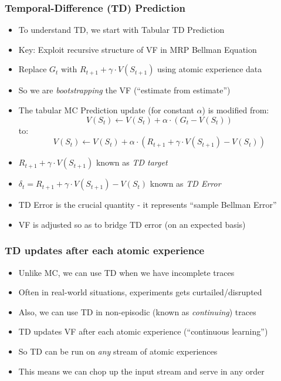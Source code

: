 \documentclass[handout]{beamer}
\begin{document}
\begin{frame}
\frametitle{Temporal-Difference (TD) Prediction}
\pause
\begin{itemize}[<+->]
\item To understand TD, we start with Tabular TD Prediction
\item Key: Exploit recursive structure of VF in MRP Bellman Equation
\item Replace $G_t$ with $R_{t+1} + \gamma \cdot V(S_{t+1})$ using atomic experience data
\item So we are {\em bootstrapping} the VF (``estimate from estimate'')
\item The tabular MC Prediction update (for constant $\alpha$) is modified from:
$$V(S_t) \leftarrow V(S_t) + \alpha \cdot (G_t - V(S_t))$$
to:
$$V(S_t) \leftarrow V(S_t) + \alpha \cdot (R_{t+1} + \gamma \cdot V(S_{t+1}) - V(S_t))$$
\item $R_{t+1} + \gamma \cdot V(S_{t+1})$ known as {\em TD target}
\item  $\delta_t = R_{t+1} + \gamma \cdot V(S_{t+1}) - V(S_t)$ known as  {\em TD Error}
\item TD Error is the crucial quantity - it represents ``sample Bellman Error''
\item VF is adjusted so as to bridge TD error (on an expected basis)
\end{itemize}
\end{frame}

\begin{frame}
\frametitle{TD updates after each atomic experience}
\pause
\begin{itemize}[<+->]
\item Unlike MC, we can use TD when we have incomplete traces
\item Often in real-world situations,  experiments gets curtailed/disrupted
\item  Also, we can use TD in non-episodic (known as {\em continuing}) traces
\item  TD updates VF after each atomic experience (``continuous learning'') 
\item So TD can be run on {\em any} stream of atomic experiences
\item This means we can chop up the input stream and serve in any order
\end{itemize}
\end{frame}
\end{document}
